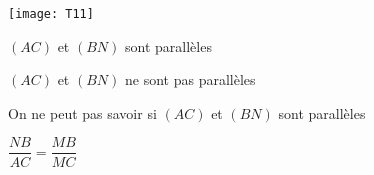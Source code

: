 \begin{QCM}
\begin{GroupeQCM}
\begin{exercice}

\texttt{[image: T11]}
\begin{ChoixQCM}{4}
\item $(AC)$ et $(BN)$ sont parallèles
\item $(AC)$ et $(BN)$ ne sont pas parallèles
\item On ne peut pas savoir si $(AC)$ 
et $(BN)$ sont parallèles
\item $\dfrac{NB}{AC}=\dfrac{MB}{MC}$
\end{ChoixQCM}
\begin{corrige}
\end{corrige}
\end{exercice}


\end{GroupeQCM}
\end{QCM}

  
